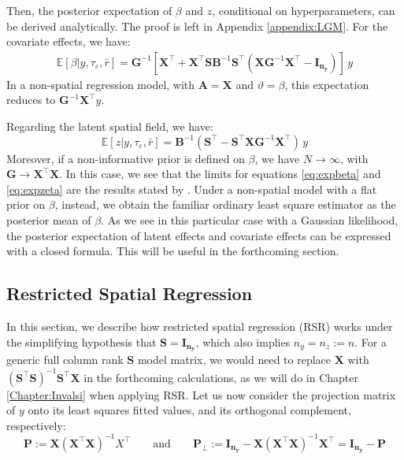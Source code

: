 \documentclass[openany, 11pt, oneside]{book}
\begin{document}
%
Then, the posterior expectation of $\beta$ and $z$, conditional on hyperparameters, can be derived analytically. The proof is left in Appendix \ref{appendix:LGM}. For the covariate effects, we have:
%
\begin{equation}
\begin{aligned}
\mathbb{E}[\beta \vert y, \tau_{\varepsilon}, \bar{r}] = \boldsymbol{G}^{-1} \left[
\boldsymbol{X}^{\top} 
+ \boldsymbol{X}^{\top} \boldsymbol{S B} ^{-1} \boldsymbol{S}^{\top}
\left(
\boldsymbol{X G}^{-1} \boldsymbol{X}^{\top} - \boldsymbol{I_{n_y}} \right)
\right] \, y
\end{aligned}
\label{eq:expbeta}
\end{equation}
In a non-spatial regression model, with $\boldsymbol{A} = \boldsymbol{X}$ and $\vartheta = \beta$, this expectation reduces to $\boldsymbol{G}^{-1}\boldsymbol{X}^\top y$. 

Regarding the latent spatial field, we have:
\begin{equation}
\mathbb{E}[z \vert y, \tau_{\varepsilon}, \bar{r}] =  \boldsymbol{B} ^{-1}
\left(\boldsymbol{S}^{\top} - \boldsymbol{S}^{\top} \boldsymbol{X G}^{-1} \boldsymbol{X}^{\top}\right) \, y
\label{eq:expzeta}
\end{equation}
%
Moreover, if a non-informative prior is defined on $\beta$, we have $N \longrightarrow \infty$, with $\boldsymbol{G} \longrightarrow \boldsymbol{X^{\top}X}$. In this case, we see that the limits for equations \ref{eq:expbeta} and \ref{eq:expzeta} are the results stated by \cite[][page 1199]{RHZ}. Under a non-spatial model with a flat prior on $\beta$, instead, we obtain the familiar ordinary least square estimator as the posterior mean of $\beta$. As we see in this particular case with a Gaussian likelihood, the posterior expectation of latent effects and covariate effects can be expressed with a closed formula. This will be useful in the forthcoming section.


 \subsection{Restricted Spatial Regression} \label{subsection:RSR}
 In this section, we describe how restricted spatial regression (RSR) works under the simplifying hypothesis that $\boldsymbol{S}=\boldsymbol{I_{n_y}}$, which also implies $n_y = n_z := n$. For a generic full column rank $\boldsymbol{S}$ model matrix, we would need to replace $\boldsymbol{X}$ with $\left(\boldsymbol{S^\top S}\right)^{-1}\boldsymbol{S^\top X}$ in the forthcoming calculations, as we will do in Chapter \ref{Chapter:Invalsi} when applying RSR.
Let us now consider the projection matrix of $y$ onto its least squares fitted values, and its orthogonal complement, respectively:
$$
\boldsymbol{P} := \boldsymbol{X}(\boldsymbol{X}^{\top}\boldsymbol{X})^{-1}X^{\top} \quad \quad \text{and} \quad \quad \boldsymbol{P_{\bot}} := \boldsymbol{I_{n_y}} - \boldsymbol{X}(\boldsymbol{X}^{\top}\boldsymbol{X})^{-1}\boldsymbol{X}^{\top} = \boldsymbol{I_{n_y}} - \boldsymbol{P}
$$
\end{document}
